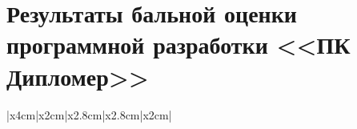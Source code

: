 \section{Результаты бальной оценки программной разработки <<ПК Дипломер>>}
\label{appendix:software_development_estimation}

\begin{longtable}{|x{4cm}|x{2cm}|x{2.8cm}|x{2.8cm}|x{2cm}|}

	\caption {Результаты бальной оценки ПО по функциональным возможностям}\label{tab:functional_features_estimation}                                                                                        \\ \hline
	\endfirsthead
	\caption* {Продолжение таблицы \ref{tab:functional_features_estimation}}                                                                                                                                \\ \hline

	\endhead

	\endfoot

	\endlastfoot


\end{longtable}

